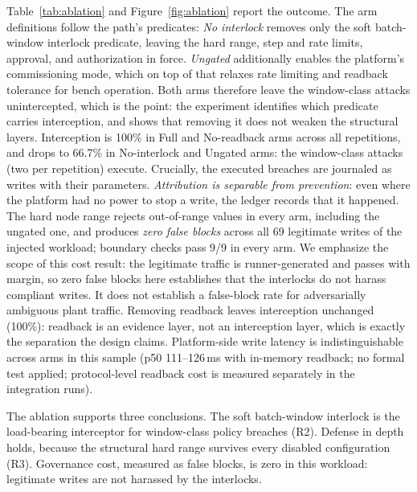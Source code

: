 Table~\ref{tab:ablation} and Figure~\ref{fig:ablation} report the
outcome. The arm definitions follow the path's predicates: \emph{No
interlock} removes only the soft batch-window interlock predicate, leaving
the hard range, step and rate limits, approval, and authorization in
force. \emph{Ungated} additionally enables the platform's commissioning
mode, which on top of that relaxes rate limiting and readback tolerance
for bench operation. Both arms therefore leave the window-class attacks
unintercepted, which is the point: the experiment identifies which
predicate carries interception, and shows that removing it does not
weaken the structural layers. Interception is 100\% in Full and
No-readback arms across all
repetitions, and drops to 66.7\% in No-interlock and Ungated arms: the
window-class attacks (two per repetition) execute. Crucially, the
executed breaches are journaled as writes with their parameters.
\emph{Attribution is separable from prevention}: even where the platform
had no power to stop a write, the ledger records that it happened. The
hard node range rejects out-of-range values in every arm, including the
ungated one, and produces \emph{zero false blocks} across all 69
legitimate writes of the injected workload; boundary checks pass 9/9 in
every arm. We emphasize the scope of this cost result: the legitimate
traffic is runner-generated and passes with margin, so zero false blocks
here establishes that the interlocks do not harass compliant writes. It
does not establish a false-block rate for adversarially ambiguous
plant traffic. Removing readback leaves interception unchanged (100\%):
readback is an evidence layer, not an interception layer, which is
exactly the separation the design claims. Platform-side write latency is
indistinguishable across arms in this sample (p50 111--126\,ms with
in-memory readback; no formal test applied; protocol-level readback cost
is measured separately in the integration runs).

The ablation supports three conclusions. The soft batch-window interlock
is the load-bearing interceptor for window-class policy breaches (R2).
Defense in depth holds, because the structural hard range survives every
disabled configuration (R3). Governance cost, measured as false
blocks, is zero in this workload: legitimate writes are not harassed
by the interlocks.

